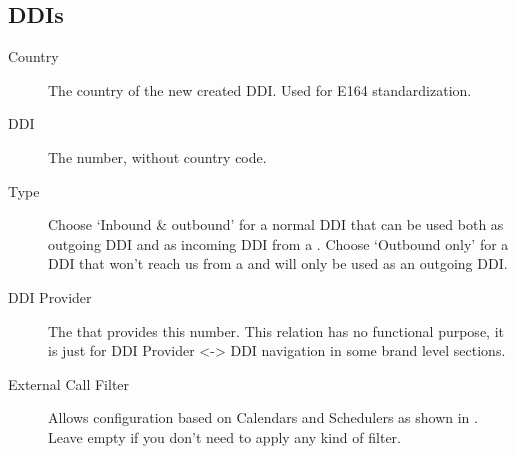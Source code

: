 \documentclass[letterpaper,10pt,spanish]{sphinxmanual}
\begin{document}
\subsection{DDIs}
\label{administration_portal/client/vpbx/ddis:ddis}\label{administration_portal/client/vpbx/ddis::doc}\label{administration_portal/client/vpbx/ddis:pbx-ddis}\begin{description}
\item[{Country}] \leavevmode{}\label{administration_portal/client/vpbx/ddis:term-country}
The country of the new created DDI. Used for E164 standardization.

\item[{DDI}] \leavevmode{}\label{administration_portal/client/vpbx/ddis:term-ddi}
The number, without country code.

\item[{Type}] \leavevmode{}\label{administration_portal/client/vpbx/ddis:term-type}
Choose `Inbound \& outbound' for a normal DDI that can be used both as outgoing DDI and as incoming DDI
from a {\hyperref[administration_portal/brand/providers/ddi_providers:ddi\string-providers]{}}. Choose `Outbound only' for a DDI that won't reach us from a
{\hyperref[administration_portal/brand/providers/ddi_providers:ddi\string-providers]{}} and will only be used as an outgoing DDI.

\item[{DDI Provider}] \leavevmode{}\label{administration_portal/client/vpbx/ddis:term-ddi-provider}
The {\hyperref[administration_portal/brand/providers/ddi_providers:ddi\string-providers]{}} that provides this number. This relation has no functional purpose, it
is just for DDI Provider \textless{}-\textgreater{} DDI navigation in some brand level sections.

\item[{External Call Filter}] \leavevmode{}\label{administration_portal/client/vpbx/ddis:term-external-call-filter}
Allows configuration based on Calendars and Schedulers as shown in
{\hyperref[administration_portal/client/vpbx/routing_tools/external_call_filters:external\string-call\string-filters]{}}. Leave empty if you don't need to apply any
kind of filter.


\end{description}
\end{document}

